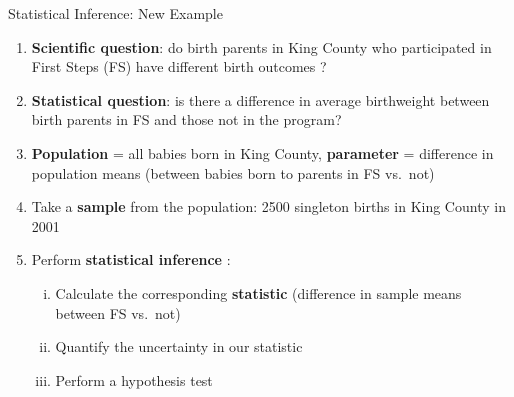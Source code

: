 \documentclass[
  ignorenonframetext,
]{beamer}
\providecommand{\tightlist}{%
  \setlength{\itemsep}{0pt}\setlength{\parskip}{0pt}}
\begin{document}
\begin{frame}{Statistical Inference: New Example}
\protect\hypertarget{statistical-inference-new-example-4}{}
\begin{enumerate}
\item
  \textbf{Scientific question}: do birth parents in King County who
  participated in First Steps (FS) have {different }{birth outcomes} ?
\item
  \textbf{Statistical question}: is there a {difference in average}
  {birthweight} between birth parents in FS and those not in the
  program?
\item
  \textbf{Population} = all babies born in King County,
  \textbf{parameter} = difference in population means (between babies
  born to parents in FS vs.~not)
\item
  Take a \textbf{sample} from the population: 2500 singleton births in
  King County in 2001
\item
  Perform \textbf{statistical inference} :

  \begin{enumerate}
  [i.]
  \tightlist
  \item
    Calculate the corresponding \textbf{statistic} (difference in sample
    means between FS vs.~not)
  \item
    Quantify the uncertainty in our statistic
  \item
    Perform a hypothesis test
  \end{enumerate}
\end{enumerate}
\end{frame}
\end{document}

